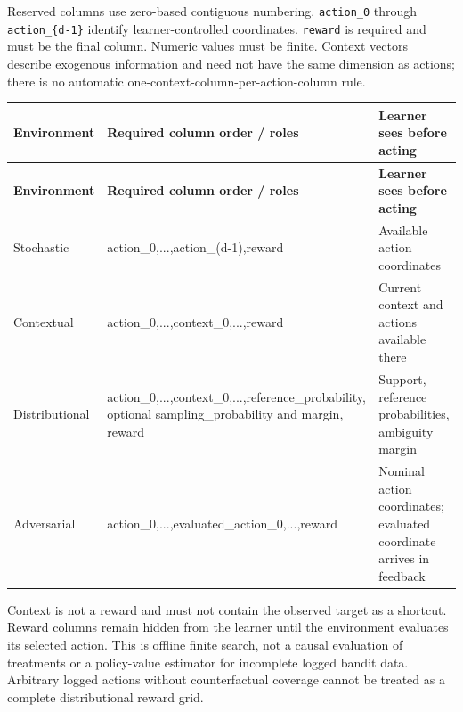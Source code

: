 \documentclass[10pt,a4paper]{article}
\begin{document}
Reserved columns use zero-based contiguous numbering. \texttt{action\_\allowbreak{}0} through \texttt{action\_\allowbreak{}\{d-1\}} identify learner-controlled coordinates. \texttt{reward} is required and must be the final column. Numeric values must be finite. Context vectors describe exogenous information and need not have the same dimension as actions; there is no automatic one-context-column-per-action-column rule.


{\small
\begin{longtable}{@{}>{\raggedright\arraybackslash}p{0.1800\dimexpr\linewidth-4\tabcolsep\relax}>{\raggedright\arraybackslash}p{0.3500\dimexpr\linewidth-4\tabcolsep\relax}>{\raggedright\arraybackslash}p{0.4700\dimexpr\linewidth-4\tabcolsep\relax}@{}}
\toprule
\textbf{Environment} & \textbf{Required column order / roles} & \textbf{Learner sees before acting} \\
\midrule\endfirsthead
\toprule
\textbf{Environment} & \textbf{Required column order / roles} & \textbf{Learner sees before acting} \\
\midrule\endhead
Stochastic & action\_\allowbreak{}0,\allowbreak{}...,\allowbreak{}action\_\allowbreak{}(d-1),\allowbreak{}reward & Available action coordinates \\
Contextual & action\_\allowbreak{}0,\allowbreak{}...,\allowbreak{}context\_\allowbreak{}0,\allowbreak{}...,\allowbreak{}reward & Current context and actions available there \\
Distributional & action\_\allowbreak{}0,\allowbreak{}...,\allowbreak{}context\_\allowbreak{}0,\allowbreak{}...,\allowbreak{}reference\_\allowbreak{}probability,\allowbreak{} optional sampling\_\allowbreak{}probability and margin,\allowbreak{} reward & Support,\allowbreak{} reference probabilities,\allowbreak{} ambiguity margin \\
Adversarial & action\_\allowbreak{}0,\allowbreak{}...,\allowbreak{}evaluated\_\allowbreak{}action\_\allowbreak{}0,\allowbreak{}...,\allowbreak{}reward & Nominal action coordinates; evaluated coordinate arrives in feedback \\
\bottomrule
\end{longtable}
}

Context is not a reward and must not contain the observed target as a shortcut. Reward columns remain hidden from the learner until the environment evaluates its selected action. This is offline finite search,\allowbreak{} not a causal evaluation of treatments or a policy-value estimator for incomplete logged bandit data. Arbitrary logged actions without counterfactual coverage cannot be treated as a complete distributional reward grid.
\end{document}
